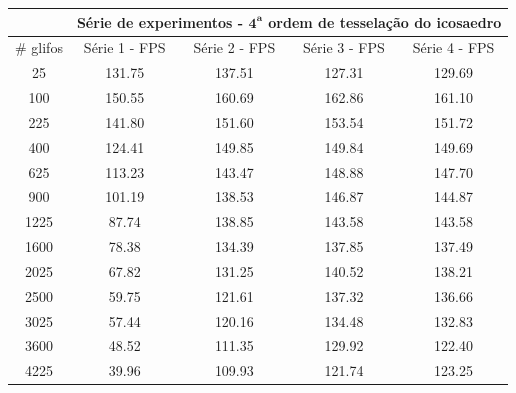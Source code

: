 \documentclass[
    12pt,                %
    oneside,            %
    a4paper,            %
    english,            %
    french,                %
    spanish,            %
    brazil                %
    ]{abntex2}
\begin{document}
\begin{apendicesenv}
\begin{table}[htb]
\begin{tabular}{c|c|c|c|c|}
\cline{2-5}
\textbf{}                       & \multicolumn{4}{c|}{\textbf{Série de experimentos - $\mathbf{4^a}$ ordem de tesselação do icosaedro}} \\ \hline
\multicolumn{1}{|c|}{\# glifos} & Série 1 - FPS       & Série 2 - FPS  & Série 3 - FPS         & Série 4 - FPS       \\ \hline
\multicolumn{1}{|c|}{25}        &  131.75              & 137.51         & 127.31                & 129.69              \\ \hline
\multicolumn{1}{|c|}{100}       &  150.55              & 160.69         & 162.86                & 161.10              \\ \hline
\multicolumn{1}{|c|}{225}       &  141.80              & 151.60         & 153.54                & 151.72              \\ \hline
\multicolumn{1}{|c|}{400}       &  124.41              & 149.85         & 149.84                & 149.69              \\ \hline
\multicolumn{1}{|c|}{625}       &  113.23              & 143.47         & 148.88                & 147.70              \\ \hline
\multicolumn{1}{|c|}{900}       &  101.19              & 138.53         & 146.87                & 144.87              \\ \hline
\multicolumn{1}{|c|}{1225}      &   87.74              & 138.85         & 143.58                & 143.58              \\ \hline
\multicolumn{1}{|c|}{1600}      &   78.38              & 134.39         & 137.85                & 137.49              \\ \hline
\multicolumn{1}{|c|}{2025}      &   67.82              & 131.25         & 140.52                & 138.21              \\ \hline
\multicolumn{1}{|c|}{2500}      &   59.75              & 121.61         & 137.32                & 136.66              \\ \hline
\multicolumn{1}{|c|}{3025}      &   57.44              & 120.16         & 134.48                & 132.83              \\ \hline
\multicolumn{1}{|c|}{3600}      &   48.52              & 111.35         & 129.92                & 122.40              \\ \hline
\multicolumn{1}{|c|}{4225}      &   39.96              & 109.93         & 121.74                & 123.25              \\ \hline

\end{tabular}
\end{table}
\end{apendicesenv}
\end{document}
